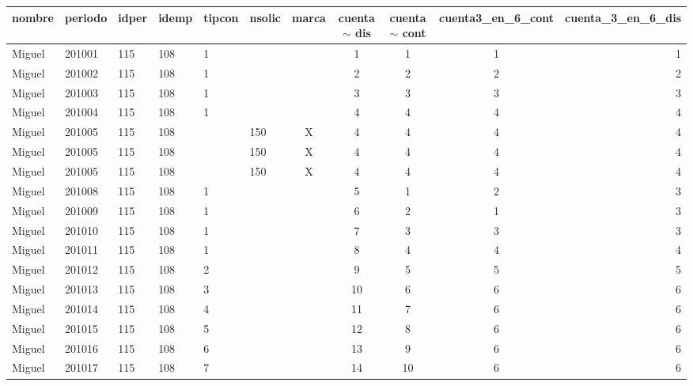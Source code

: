 \begin{tabular}{m{30pt}<{\raggedrigth}*{5}{m{20pt}<{\centering}}*{4}{c}r}
\toprule
nombre & periodo & idper & idemp & tipcon & nsolic & marca &  cuenta$\sim$ dis & cuenta$\sim$ cont & cuenta3\_en\_6\_cont & cuenta\_3\_en\_6\_dis\\ \midrule
Miguel&201001&115&108&1&&&1&1&1&1\\
Miguel&201002&115&108&1&&&2&2&2&2\\
Miguel&201003&115&108&1&&&3&3&3&3\\
Miguel&201004&115&108&1&&&4&4&4&4\\
Miguel&201005&115&108&&150&X&4&4&4&4\\
Miguel&201005&115&108&&150&X&4&4&4&4\\
Miguel&201005&115&108&&150&X&4&4&4&4\\
Miguel&201008&115&108&1&&&5&1&2&3\\
Miguel&201009&115&108&1&&&6&2&1&3\\
Miguel&201010&115&108&1&&&7&3&3&3\\
Miguel&201011&115&108&1&&&8&4&4&4\\
Miguel&201012&115&108&2&&&9&5&5&5\\
Miguel&201013&115&108&3&&&10&6&6&6\\
Miguel&201014&115&108&4&&&11&7&6&6\\
Miguel&201015&115&108&5&&&12&8&6&6\\
Miguel&201016&115&108&6&&&13&9&6&6\\
Miguel&201017&115&108&7&&&14&10&6&6\\
\bottomrule
\end{tabular}
